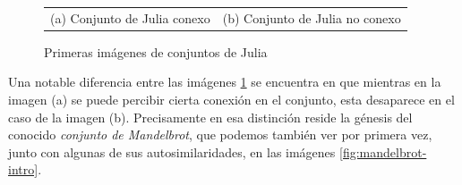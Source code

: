 \begin{figure}[ht]
\begin{tabular}{cc}
    (a) Conjunto de Julia conexo & (b) Conjunto de Julia no conexo  \\[6pt]
    \end{tabular}
    \caption{Primeras imágenes de conjuntos de Julia}
    \label{fig:julia-intro}
\end{figure}

Una notable diferencia entre las imágenes \ref{fig:julia-intro} se encuentra en que mientras en la imagen (a) se puede percibir cierta conexión en el conjunto, esta desaparece en el caso de la imagen (b). Precisamente en esa distinción reside la génesis del conocido \textit{conjunto de Mandelbrot}, que podemos también ver por primera vez, junto con algunas de sus autosimilaridades, en las imágenes \ref{fig:mandelbrot-intro}.

\begin{figure}[ht]
  \centering
  \begin{tabular}{cc}

\end{tabular}
\end{figure}
